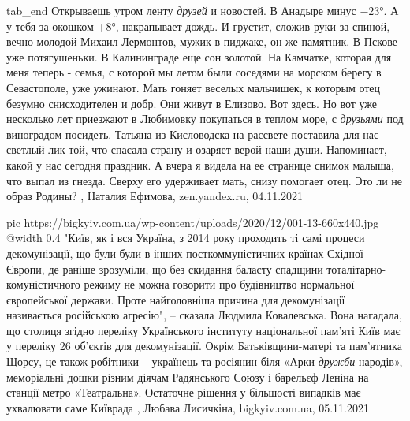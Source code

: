   tab_end
\fi
Открываешь утром ленту \emph{друзей} и новостей. В Анадыре минус −23°. А у тебя за
окошком +8°, накрапывает дождь. И грустит, сложив руки за спиной, вечно молодой
Михаил Лермонтов, мужик в пиджаке, он же памятник.  В Пскове уже потягушеньки.
В Калининграде еще сон золотой. На Камчатке, которая для меня теперь - семья, с
которой мы летом были соседями на морском берегу в Севастополе, уже ужинают.
Мать гоняет веселых мальчишек, к которым отец безумно снисходителен и добр.
Они живут в Елизово. Вот здесь.  Но вот уже несколько лет приезжают в Любимовку
покупаться в теплом море, с \emph{друзьями} под виноградом посидеть.  Татьяна
из Кисловодска на рассвете поставила для нас светлый лик той, что спасала
страну и озаряет верой наши души. Напоминает, какой у нас сегодня праздник.
А вчера я видела на ее странице снимок малыша, что выпал из гнезда.  Сверху его
удерживает мать, снизу помогает отец. Это ли не образ Родины?
, Наталия Ефимова, zen.yandex.ru, 04.11.2021

\ifcmt
  pic https://bigkyiv.com.ua/wp-content/uploads/2020/12/001-13-660x440.jpg
  @width 0.4
\fi
"Київ, як і вся Україна, з 2014 року проходить ті самі процеси декомунізації,
що були були в інших посткоммуністичних країнах Східної Європи, де раніше
зрозуміли, що без скидання баласту спадщини тоталітарно-комуністичного режиму
не можна говорити про будівництво нормальної європейської держави. Проте
найголовніша причина для декомунізації називається російською агресію", –
сказала Людмила Ковалевська.  Вона нагадала, що столиця згідно переліку
Українського інституту національної пам'яті Київ має у переліку 26 об'єктів для
декомунізації. Окрім Батьківщини-матері та пам'ятника Щорсу, це також робітники
– українець та росіянин біля «Арки \emph{дружби} народів», меморіальні дошки
різним діячам Радянського Союзу і барельєф Леніна на станції метро
«Театральна». Остаточне рішення у більшості випадків має ухвалювати саме
Київрада
, 
Любава Лисичкіна, bigkyiv.com.ua, 05.11.2021

